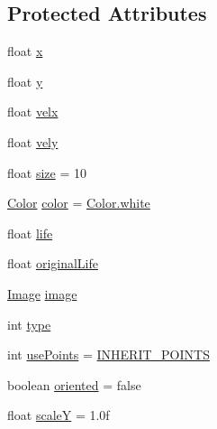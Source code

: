 \subsection*{Protected Attributes}
\begin{DoxyCompactItemize}
\item 
float \mbox{\hyperlink{classorg_1_1newdawn_1_1slick_1_1particles_1_1_particle_ae1ee7d5a72b34bbdb44110dfa2795674}{x}}
\item 
float \mbox{\hyperlink{classorg_1_1newdawn_1_1slick_1_1particles_1_1_particle_ad784e37c1fdad77abc886521b8e907b2}{y}}
\item 
float \mbox{\hyperlink{classorg_1_1newdawn_1_1slick_1_1particles_1_1_particle_a9056abd13cffd1064051f9a34a3e70ef}{velx}}
\item 
float \mbox{\hyperlink{classorg_1_1newdawn_1_1slick_1_1particles_1_1_particle_a799a64a459185f49bcf1e71a53e59014}{vely}}
\item 
float \mbox{\hyperlink{classorg_1_1newdawn_1_1slick_1_1particles_1_1_particle_a93954bf2e145c626121ad55dd164b9fc}{size}} = 10
\item 
\mbox{\hyperlink{classorg_1_1newdawn_1_1slick_1_1_color}{Color}} \mbox{\hyperlink{classorg_1_1newdawn_1_1slick_1_1particles_1_1_particle_a2467718786828ecca08ea7f4bfd1c47d}{color}} = \mbox{\hyperlink{classorg_1_1newdawn_1_1slick_1_1_color_afcd91cbdd26233d226d734f70dca3d2e}{Color.\+white}}
\item 
float \mbox{\hyperlink{classorg_1_1newdawn_1_1slick_1_1particles_1_1_particle_a361d2a9d01b66d38d90496c096970aab}{life}}
\item 
float \mbox{\hyperlink{classorg_1_1newdawn_1_1slick_1_1particles_1_1_particle_a7f473d309ac29f2740d498c7d3d58f98}{original\+Life}}
\item 
\mbox{\hyperlink{classorg_1_1newdawn_1_1slick_1_1_image}{Image}} \mbox{\hyperlink{classorg_1_1newdawn_1_1slick_1_1particles_1_1_particle_a1d154fcb0fa4f99035f4faff21919ec9}{image}}
\item 
int \mbox{\hyperlink{classorg_1_1newdawn_1_1slick_1_1particles_1_1_particle_a8c228f79bbcb3a100f9b03ca98e29602}{type}}
\item 
int \mbox{\hyperlink{classorg_1_1newdawn_1_1slick_1_1particles_1_1_particle_afd267c52267755cd8aacc3113dd87ed8}{use\+Points}} = \mbox{\hyperlink{classorg_1_1newdawn_1_1slick_1_1particles_1_1_particle_a6ecc8039f2f03eab74b6b22ce786d176}{I\+N\+H\+E\+R\+I\+T\+\_\+\+P\+O\+I\+N\+TS}}
\item 
boolean \mbox{\hyperlink{classorg_1_1newdawn_1_1slick_1_1particles_1_1_particle_ad5b898bd35ce1b209c5f6372b1667fc2}{oriented}} = false
\item 
float \mbox{\hyperlink{classorg_1_1newdawn_1_1slick_1_1particles_1_1_particle_a0dacb1e81d57ee4528c8ac82033eb585}{scaleY}} = 1.\+0f
\end{DoxyCompactItemize}
